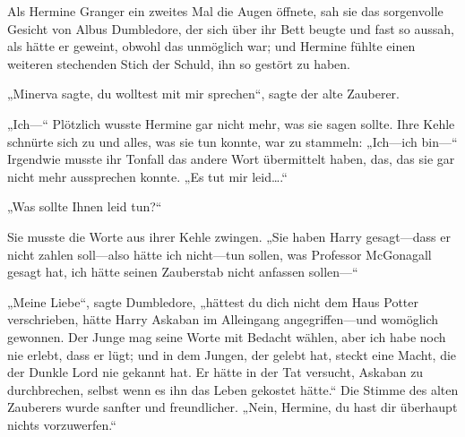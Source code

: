 Als Hermine Granger ein zweites Mal die Augen öffnete, sah sie das sorgenvolle Gesicht von Albus Dumbledore, der sich über ihr Bett beugte und fast so aussah, als hätte er geweint, obwohl das unmöglich war; und Hermine fühlte einen weiteren stechenden Stich der Schuld, ihn so gestört zu haben.

„Minerva sagte, du wolltest mit mir sprechen“, sagte der alte Zauberer.


„Ich—“ Plötzlich wusste Hermine gar nicht mehr, was sie sagen sollte. Ihre Kehle schnürte sich zu und alles, was sie tun konnte, war zu stammeln: „Ich—ich bin—“ Irgendwie musste ihr Tonfall das andere Wort übermittelt haben, das, das sie gar nicht mehr aussprechen konnte. „Es tut mir leid….“

„Was sollte Ihnen leid tun?“

Sie musste die Worte aus ihrer Kehle zwingen.
„Sie haben Harry gesagt—dass er nicht zahlen soll—also hätte ich nicht—tun sollen, was Professor McGonagall gesagt hat, ich hätte seinen Zauberstab nicht anfassen sollen—“

„Meine Liebe“, sagte Dumbledore, „hättest du dich nicht dem Haus Potter verschrieben, hätte Harry Askaban im Alleingang angegriffen—und womöglich gewonnen. Der Junge mag seine Worte mit Bedacht wählen, aber ich habe noch nie erlebt, dass er lügt; und in dem Jungen, der gelebt hat, steckt eine Macht, die der Dunkle Lord nie gekannt hat. Er hätte in der Tat versucht, Askaban zu durchbrechen, selbst wenn es ihn das Leben gekostet hätte.“
Die Stimme des alten Zauberers wurde sanfter und freundlicher.
„Nein, Hermine, du hast dir überhaupt nichts vorzuwerfen.“

